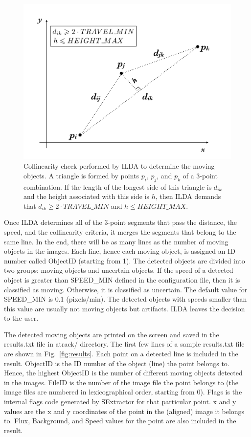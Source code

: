 \documentclass[review]{elsarticle}
\begin{document}
\begin{figure}[!h]
  \centering
  \includegraphics[width=1.0\textwidth]{figure_4_line_segment}
  \caption{Collinearity check performed by ILDA to determine the moving objects. A triangle is formed by points $p_i$, $p_j$, and $p_k$ of a 3-point combination. If the length of the longest side of this triangle is $d_{ik}$ and the height associated with this side is $h$, then ILDA demands that $d_{ik} \geq 2 \cdot TRAVEL\_MIN$ and $h \leq HEIGHT\_MAX$.}
  \label{fig:linesegment}
\end{figure}

Once ILDA determines all of the 3-point segments that pass the distance, the speed, and the collinearity criteria, it merges the segments that belong to the same line. In the end, there will be as many lines as the number of moving objects in the images. Each line, hence each moving object, is assigned an ID number called ObjectID (starting from 1). The detected objects are divided into two groups: moving objects and uncertain objects. If the speed of a detected object is greater than SPEED\_MIN defined in the configuration file, then it is classified as moving. Otherwise, it is classified as uncertain. The default value for SPEED\_MIN is 0.1 (pixels/min). The detected objects with speeds smaller than this value are usually not moving objects but artifacts. ILDA leaves the decision to the user.

The detected moving objects are printed on the screen and saved in the results.txt file in atrack/ directory. The first few lines of a sample results.txt file are shown in Fig.~\ref{fig:results}. Each point on a detected line is included in the result. ObjectID is the ID number of the object (line) the point belongs to. Hence, the highest ObjectID is the number of different moving objects detected in the images. FileID is the number of the image file the point belongs to (the image files are numbered in lexicographical order, starting from 0). Flags is the internal flags code generated by SExtractor for that particular point. x and y values are the x and y coordinates of the point in the (aligned) image it belongs to. Flux, Background, and Speed values for the point are also included in the result.
\end{document}
